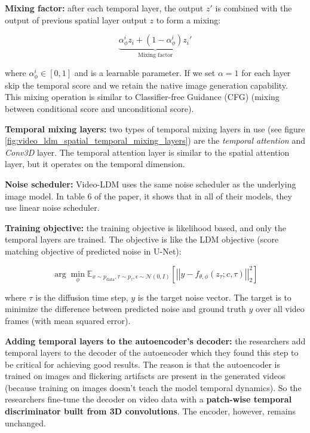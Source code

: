 \textbf{Mixing factor:} after each temporal layer, the output $z'$ is combined with the output of previous spatial layer output $z$ to form a mixing: 

\[ \underbrace{\alpha_\phi^i z_{i} + (1 - \alpha_\phi^i) z_{i}'}_{\text{Mixing factor}} \] 

where $\alpha_\phi^i \in [0, 1]$ and is a learnable parameter. If we set $\alpha = 1$ for each layer skip the temporal score and we retain the native image generation capability. This mixing operation is similar to Classifier-free Guidance (CFG) (mixing between conditional score and unconditional score).

\textbf{Temporal mixing layers:} two types of temporal mixing layers in use (see figure \ref{fig:video_ldm_spatial_temporal_mixing_layers}) are the \textit{temporal attention} and \textit{Conv3D} layer. The temporal attention layer is similar to the spatial attention layer, but it operates on the temporal dimension.

\textbf{Noise scheduler:} Video-LDM uses the same noise scheduler as the underlying image model. In table 6 of the paper, it shows that in all of their models, they use linear noise scheduler.

\textbf{Training objective:} the training objective is likelihood based, and only the temporal layers are trained. The objective is like the LDM objective (score matching objective of predicted noise in U-Net):

\[ \arg \min_\phi \mathbb{E}_{x \sim p_{\text{data}}, \tau \sim p_{\tau}, \epsilon \sim \mathcal{N} (0, I)} \left[ \left| \left| y - f_{\theta,\phi} (z_{\tau} ; c, \tau) \right| \right|^2_2 \right] \]

where $\tau$ is the diffusion time step, $y$ is the target noise vector. The target is to minimize the difference between predicted noise and ground truth $y$ over all video frames (with mean squared error).

\textbf{Adding temporal layers to the autoencoder's decoder:} the researchers add temporal layers to the decoder of the autoencoder which they found this step to be critical for achieving good results. The reason is that the autoencoder is trained on images and flickering artifacts are present in the generated videos (because training on images doesn't teach the model temporal dynamics). So the researchers fine-tune the decoder on video data with a \textbf{patch-wise temporal discriminator built from 3D convolutions}. The encoder, however, remains unchanged.

